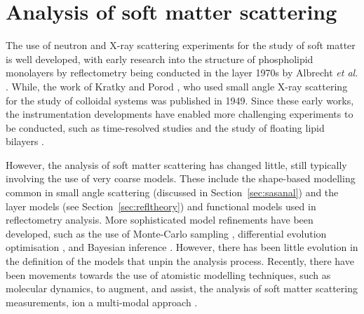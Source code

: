 \section{Analysis of soft matter scattering}

The use of neutron and X-ray scattering experiments for the study of soft matter is well developed, with early research into the structure of phospholipid monolayers by reflectometry being conducted in the layer 1970s by Albrecht \emph{et al.} \cite{albrecht_polymorphism_1978}.
While, the work of Kratky and Porod \cite{kratky_diffuse_1949}, who used small angle X-ray scattering for the study of colloidal systems was published in 1949.
Since these early works, the instrumentation developments have enabled more challenging experiments to be conducted, such as time-resolved studies \cite{jensen_monitoring_2014} and the study of floating lipid bilayers \cite{rondelli_reflectivity_2012}.

However, the analysis of soft matter scattering has changed little, still typically involving the use of very coarse models.
These include the shape-based modelling common in small angle scattering (discussed in Section~\ref{sec:sasanal}) \cite{hassan_small_2003} and the layer models (see Section~\ref{sec:refltheory}) \cite{campbell_structure_2018} and functional models \cite{lu_analysis_1996} used in reflectometry analysis.
More sophisticated model refinements have been developed, such as the use of Monte-Carlo sampling \cite{pedersen_monte_2002}, differential evolution optimisation \cite{wormington_characterization_1999}, and Bayesian inference \cite{nelson_refnx_2019}.
However, there has been little evolution in the definition of the models that unpin the analysis process.
Recently, there have been movements towards the use of atomistic modelling techniques, such as molecular dynamics, to augment, and assist, the analysis of soft matter scattering measurements, ion a multi-modal approach \cite{scoppola_combining_2018}.

